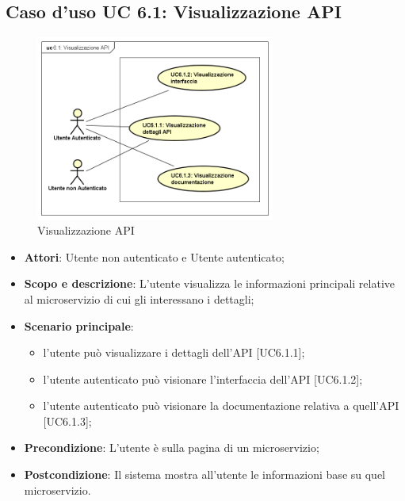 \documentclass[12pt,a4paper,titlepage]{article}
\begin{document}
	\subsection{Caso d'uso UC 6.1: Visualizzazione API}
	\label{UC6.1}
	\begin{figure}[H]
		\centering
		\includegraphics[width=0.7\textwidth]{UseCase/VisualizzazioneAPI}
		\caption{Visualizzazione API}
	\end{figure}
	\begin{itemize}
		\item \textbf{Attori}: Utente non autenticato e Utente autenticato;
		\item \textbf{Scopo e descrizione}: L'utente visualizza le informazioni principali relative al microservizio di cui gli interessano i dettagli;
		\item \textbf{Scenario principale}:
		\begin{itemize}
			\item l'utente può visualizzare i dettagli dell'API [UC6.1.1];
			\item l'utente autenticato può visionare l'interfaccia dell'API [UC6.1.2];
			\item l'utente autenticato può visionare la documentazione relativa a quell'API [UC6.1.3];
		\end{itemize}
		\item \textbf{Precondizione}: L'utente è sulla pagina di un microservizio;
		\item \textbf{Postcondizione}: Il sistema mostra all'utente le informazioni base su quel microservizio.
	\end{itemize}
\end{document}

